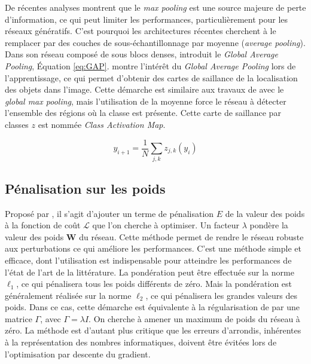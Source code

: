 De récentes analyses montrent que le \textit{max pooling} est une source majeure de perte d'information, ce qui peut limiter les performances, particulièrement pour les réseaux génératifs.
C'est pourquoi les architectures récentes cherchent à le remplacer par des couches de sous-échantillonnage par moyenne (\textit{average pooling}).
Dans son réseau composé de sous blocs denses, \cite{lin_network_2013} introduit le \textit{Global Average Pooling}, Équation \ref{eq:GAP}.
\cite{zhou_learning_2015} montre l'intérêt du \textit{Global Average Pooling} lors de l'apprentissage, ce qui permet d'obtenir des cartes de saillance de la localisation des objets dans l'image.
Cette démarche est similaire aux travaux de \citeauthor{oquab_object_2015} \cite{oquab_object_2015} avec le \textit{global max pooling}, mais l'utilisation de la moyenne force le réseau à détecter l'ensemble des régions où la classe est présente.
Cette carte de saillance par classes $z$ est nommée \textit{Class Activation Map}.

\begin{equation} \label{eq:GAP}
y_{i+1} = \frac{1}{N} \sum_{j, k} z_{j, k}(y_i)
\end{equation}


\subsection{Pénalisation sur les poids} \label{parag:weights_decay}
Proposé par \citeauthor{krogh_simple_1991} \cite{krogh_simple_1991}, il s'agit d'ajouter un terme de pénalisation $E$ de la valeur des poids à la fonction de coût $\mathcal{L}$ que l'on cherche à optimiser.
Un facteur $\lambda$ pondère la valeur des poids $\mathbf{W}$ du réseau.
Cette méthode permet de rendre le réseau robuste aux perturbations ce qui améliore les performances.
C'est une méthode simple et efficace, dont l'utilisation est indispensable pour atteindre les performances de l'état de l'art de la littérature.
La pondération peut être effectuée sur la norme $\ell_{1}$, ce qui pénalisera tous les poids différents de zéro.
Mais la pondération est généralement réalisée sur la norme $\ell_{2}$, ce qui pénalisera les grandes valeurs des poids.
Dans ce cas, cette démarche est équivalente à la régularisation de \citeauthor{tikhonov_stability_1943} \cite{tikhonov_stability_1943, tikhonov_solutions_1977} par une matrice $\Gamma$, avec $\Gamma=\lambda I$.
On cherche à amener un maximum de poids du réseau à zéro.
La méthode est d'autant plus critique que les erreurs d'arrondis, inhérentes à la représentation des nombres informatiques, doivent être évitées lors de l'optimisation par descente du gradient.

